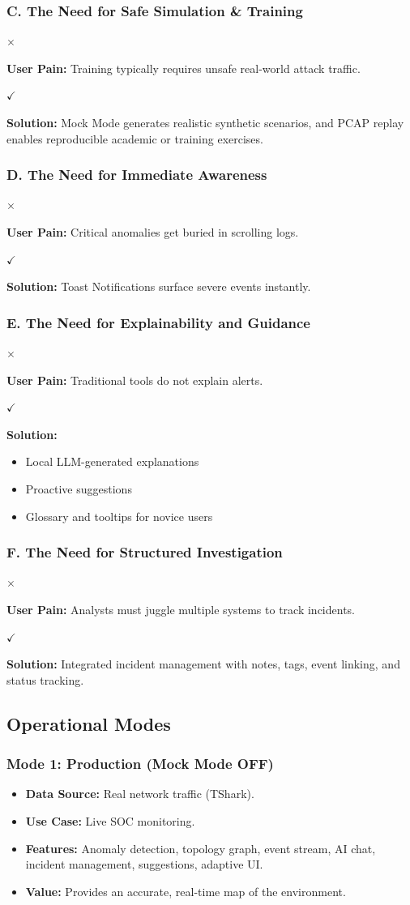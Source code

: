 \documentclass[
    11pt, 
    a4paper, 
    parskip=half, 
    headsepline,       %
    DIV=12             %
]{scrartcl}
\newcommand{\painpoint}[2]{
    \vspace{0.4em}
    \noindent
    \begin{minipage}[t]{0.05\linewidth}
        \color{pfRed}\small\bfseries $\times$
    \end{minipage}%
    \begin{minipage}[t]{0.95\linewidth}
        {\small\bfseries\color{pfRed} User Pain:} #1
    \end{minipage}\par
    \vspace{0.1em}
    \noindent
    \begin{minipage}[t]{0.05\linewidth}
        \color{pfCyan}\small\bfseries $\checkmark$
    \end{minipage}%
    \begin{minipage}[t]{0.95\linewidth}
        {\small\bfseries\color{pfCyan} Solution:} #2
    \end{minipage}
    \vspace{0.6em}
}
\begin{document}
\subsubsection*{C. The Need for Safe Simulation \& Training}
\painpoint{Training typically requires unsafe real-world attack traffic.}
{Mock Mode generates realistic synthetic scenarios, and PCAP replay enables reproducible academic or training exercises.}

\subsubsection*{D. The Need for Immediate Awareness}
\painpoint{Critical anomalies get buried in scrolling logs.}
{Toast Notifications surface severe events instantly.}

\subsubsection*{E. The Need for Explainability and Guidance}
\painpoint{Traditional tools do not explain alerts.}
{
    \vspace{-0.5em}
    \begin{itemize}[leftmargin=1.2em, nosep]
        \item Local LLM-generated explanations
        \item Proactive suggestions
        \item Glossary and tooltips for novice users
    \end{itemize}
}

\subsubsection*{F. The Need for Structured Investigation}
\painpoint{Analysts must juggle multiple systems to track incidents.}
{Integrated incident management with notes, tags, event linking, and status tracking.}

\subsection{Operational Modes}

\subsubsection*{Mode 1: Production (Mock Mode OFF)}
\begin{itemize}
    \item \textbf{Data Source:} Real network traffic (TShark).
    \item \textbf{Use Case:} Live SOC monitoring.
    \item \textbf{Features:} Anomaly detection, topology graph, event stream, AI chat, incident management, suggestions, adaptive UI.
    \item \textbf{Value:} Provides an accurate, real-time map of the environment.
\end{itemize}
\end{document}
